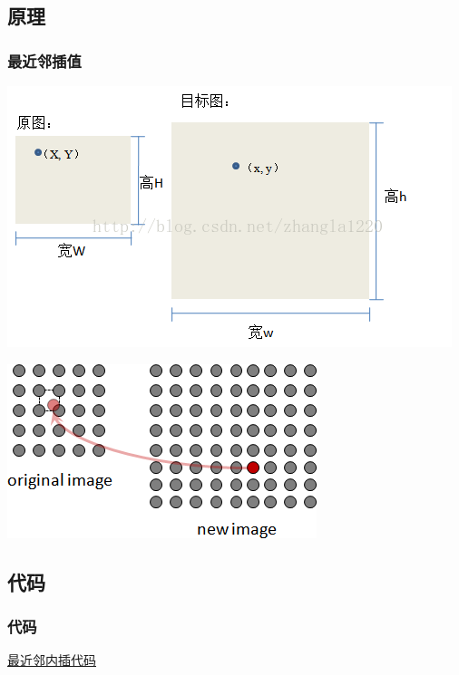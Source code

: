 \documentclass[notheorems,serif,table,compress]{beamer}  %
\begin{document}
\subsection{原理}
\begin{frame}
\frametitle{最近邻插值}
    	\begin{minipage}[t]{0.5\linewidth}
        \centering
        \includegraphics[width=1\linewidth]{near.jpg} 
        \end{minipage}
	\begin{minipage}[t]{0.4\linewidth}
        \centering
        \includegraphics[width=1\linewidth]{n.png} 
        \end{minipage}
\end{frame}

\subsection{代码}
\begin{frame}
\frametitle{代码}
\href{code/nearest.cpp}{最近邻内插代码}
\end{frame}
\end{document}
